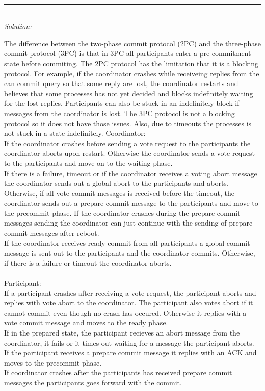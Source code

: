 \documentclass[a4paper]{article}
\newcommand{\horrule}[1]{\rule{\linewidth}{#1}} %
\newcommand{\solution}[1]{\\\horrule{0.5pt}\\[3pt]\textit{Solution: }\\[0.1cm]\begin{minipage}{\textwidth}#1\end{minipage}}
\begin{document}
%
\solution{
  The difference between the two-phase commit protocol (2PC)
  and the three-phase commit protocol (3PC) is that in 3PC all
  participants enter a pre-commitment state before commiting.
  The 2PC protocol has the limitation that it is a blocking 
  protocol. For example, if the coordinator crashes while 
  receiveing replies from the can commit query so that some reply
  are lost, the coordinator restarts and believes that some processes
  has not yet decided and blocks indefinitely waiting for the lost
  replies. Participants can also be stuck in an indefinitely block
  if messages from the coordinator is lost.
  The 3PC protocol is not a blocking protocol so it does not have 
  those issues. Also, due to timeouts the processes is not stuck in 
  a state indefinitely.
\usebox{\userinput}
  Coordinator:\\
  If the coordinator crashes before sending a vote request to the 
  participants the coordinator aborts upon restart. Otherwise the
  coordinator sends a vote request to the participants and move
  on to the waiting phase.\\
  If there is a failure, timeout or if the coordinator receives a
  voting abort message the coordinator sends out a global abort to
  the participants and aborts. Otherwise, if all vote commit messages
  is received before the timeout, the coordinator sends out a prepare
  commit message to the participants and move to the precommit phase. 
  If the coordinator crashes during the prepare commit messages sending
  the coordinator can just continue with the sending of prepare commit
  messages after reboot.\\ 
  If the coordinator receives ready commit from all participants a global
  commit message is sent out to the participants and the coordinator
  commits. Otherwise, if there is a failure or timeout the coordinator
  aborts. \\\\
  Participant:\\ 
  If a participant crashes after receiving a vote request, the 
  participant aborts and replies with vote abort to the coordinator.
  The participant also votes abort if it cannot commit even though 
  no crash has occured. Otherwise it replies with a vote commit message
  and moves to the ready phase. \\
  If in the prepared state, the participant recieves an abort message
  from the coordinator, it fails or it times out waiting for a message
  the participant aborts. If the participant receives a prepare commit
  message it replies with an ACK and moves to the precommit phase. \\
  If coordinator crashes after the participants has received prepare 
  commit messages the participants goes forward with the commit. 
}
\end{document}
